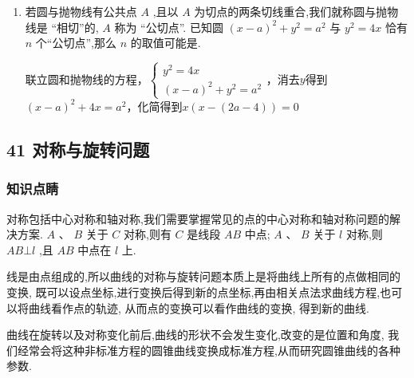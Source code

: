 \begin{enumerate}
    \item 若圆与抛物线有公共点 $A$ ,且以 $A$ 为切点的两条切线重合,我们就称圆与抛物线是 “相切”的, $A$ 称为 “公切点”. 已知圆 ${\left( x - a\right) }^{2} + {y}^{2} = {a}^{2}$ 与 ${y}^{2} = {4x}$ 恰有 $n$ 个“公切点”,那么 $n$ 的取值可能是.
    \begin{jieda}
        联立圆和抛物线的方程，$\left\{\begin{array}{l}
             {y}^{2} = {4x}  \\
             {\left( x - a\right) }^{2} + {y}^{2} = {a}^{2}
        \end{array}\right.$，消去$y$得到${\left( x - a\right) }^{2} + 4x = {a}^{2}$，化简得到$x(x-(2a-4)) = 0$
    \end{jieda}
\end{enumerate}

\subsection*{41 对称与旋转问题}

\subsubsection*{知识点睛}

对称包括中心对称和轴对称,我们需要掌握常见的点的中心对称和轴对称问题的解决方案. $A\text{ 、 }B$ 关于 $C$ 对称,则有 $C$ 是线段 ${AB}$ 中点; $A\text{ 、 }B$ 关于 $l$ 对称,则 ${AB}\bot l$ ,且 ${AB}$ 中点在 $l$ 上.

线是由点组成的,所以曲线的对称与旋转问题本质上是将曲线上所有的点做相同的变换, 既可以设点坐标,进行变换后得到新的点坐标,再由相关点法求曲线方程,也可以将曲线看作点的轨迹, 从而点的变换可以看作曲线的变换, 得到新的曲线.

曲线在旋转以及对称变化前后,曲线的形状不会发生变化,改变的是位置和角度, 我们经常会将这种非标准方程的圆锥曲线变换成标准方程,从而研究圆锥曲线的各种参数.

